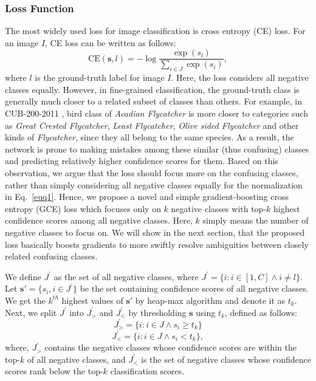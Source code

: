 \documentclass[letterpaper]{article} \usepackage{aaai20}  \usepackage{times}  \usepackage{helvet} \usepackage{courier}  \usepackage[hyphens]{url}  \usepackage{graphicx} \usepackage{multirow}
\begin{document}
\subsubsection{Loss Function}
The most widely used loss for image classification is cross entropy (CE) loss. For an image $I$, CE loss can be written as follows:
\begin{equation}\label{euq1}
    \text{CE}(\mathbf{s},l)=-\log \frac{\exp{(s_{l})}}{\sum_{i \in J}\exp{(s_i)}},
\end{equation}
where $l$ is the ground-truth label for image $I$. Here, the loss considers all negative classes equally. However, in fine-grained classification, the ground-truth class is generally much closer to a related subset of classes than others. For example, in CUB-200-2011 \cite{dataset_cub}, bird class of \emph{Acadian Flycatcher} is more closer to categories such as \emph{Great Crested Flycatcher}, \emph{Least Flycatcher}, \emph{Olive sided Flycatcher} and other kinds of \emph{Flycatcher}, since they all belong to the same species. As a result, the network is prone to making mistakes among these similar (thus confusing) classes and predicting relatively higher confidence scores for them. Based on this observation, we argue that the loss should focus more on the confusing classes, rather than simply considering all negative classes equally for the normalization in Eq.~\ref{euq1}. Hence, we propose a novel and simple gradient-boosting cross entropy (GCE) loss which focuses only on $k$ negative classes with top-$k$ highest confidence scores among all negative classes. Here, $k$ simply means the number of negative classes to focus on. We will show in the next section, that the proposed loss basically boosts gradients to more swiftly resolve ambiguities between closely related confusing classes.  

We define $J^{'}$ as the set of all negative classes, where $J^{'}=\{i : i \in [1,C] \wedge i \neq l\}$. Let $\mathbf{s}'=\{s_i,i \in J^{'} \}$ be the set containing confidence scores of all negative classes. We get the $k^{th}$ highest values of $\mathbf{s}'$ by heap-max algorithm \cite{max_heap} and denote it as $t_k$. Next, we split $J^{'}$ into $J^{'}_{>}$ and $J^{'}_{<}$ by thresholding $\mathbf{s}$ using $t_k$, defined as follows:
\begin{equation}\label{equ_set1}
    J^{'}_{>}=\{i: i \in J \wedge s_i \geq t_k\}
\end{equation}
\begin{equation}\label{equ_set2}
    J^{'}_{<}=\{i: i \in J \wedge s_i<t_k\},
\end{equation}
where, $J^{'}_{>}$ contains the negative classes whose confidence scores are within the top-$k$ of all negative classes, and $J^{'}_{<}$ is the set of negative classes whose confidence scores rank below the top-$k$ classification scores.  
\end{document}
